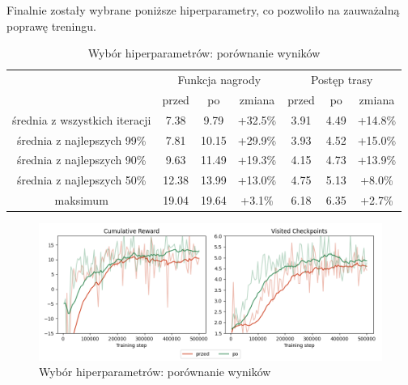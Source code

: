 Finalnie zostały wybrane poniższe hiperparametry, co pozwoliło na zauważalną poprawę treningu.
\begin{table}[H]
    \centering
    \begin{tabular}{|c|c|c|c|c|c|c|}
        \hline
        & \multicolumn{3}{c|}{Funkcja nagrody} & \multicolumn{3}{c|}{Postęp trasy}\\
        & przed & po & zmiana & przed & po & zmiana \\
        \hline
        \hline
        średnia z wszystkich iteracji &  7.38 &  9.79 & +32.5\% & 3.91 & 4.49 & +14.8\% \\
        średnia z najlepszych 99\%    &  7.81 & 10.15 & +29.9\% & 3.93 & 4.52 & +15.0\% \\
        średnia z najlepszych 90\%    &  9.63 & 11.49 & +19.3\% & 4.15 & 4.73 & +13.9\% \\
        średnia z najlepszych 50\%    & 12.38 & 13.99 & +13.0\% & 4.75 & 5.13 &  +8.0\% \\
        maksimum                      & 19.04 & 19.64 &  +3.1\% & 6.18 & 6.35 &  +2.7\% \\
        \hline
    \end{tabular}
    \caption{Wybór hiperparametrów: porównanie wyników}
    \label{table}
\end{table}
\begin{figure}[H]
    \centering
    \includegraphics[width=\textwidth]{graphs/hyperparameters_tuning_results.png}
    \caption{Wybór hiperparametrów: porównanie wyników}
    \label{fig}
\end{figure}


